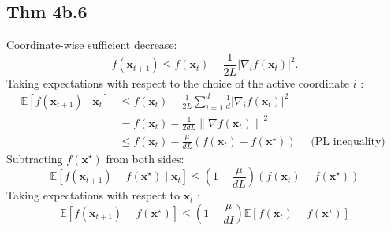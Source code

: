 \subsection*{Thm 4b.6}
Coordinate-wise sufficient decrease:
$$
f\left(\mathbf{x}_{t+1}\right) \leq f\left(\mathbf{x}_{t}\right)-\frac{1}{2 L}\left|\nabla_{i} f\left(\mathbf{x}_{t}\right)\right|^{2} .
$$
Taking expectations with respect to the choice of the active coordinate $i$ :
$$
\begin{aligned}
\mathbb{E}\left[f\left(\mathbf{x}_{t+1}\right) \mid \mathbf{x}_{t}\right] & \leq f\left(\mathbf{x}_{t}\right)-\frac{1}{2 L} \sum_{i=1}^{d} \frac{1}{d}\left|\nabla_{i} f\left(\mathbf{x}_{t}\right)\right|^{2} \\
&=f\left(\mathbf{x}_{t}\right)-\frac{1}{2 d L}\left\|\nabla f\left(\mathbf{x}_{t}\right)\right\|^{2} \\
& \leq f\left(\mathbf{x}_{t}\right)-\frac{\mu}{d L}\left(f\left(\mathbf{x}_{t}\right)-f\left(\mathbf{x}^{\star}\right)\right) \quad \text { (PL inequality) }
\end{aligned}
$$
Subtracting $f\left(\mathbf{x}^{\star}\right)$ from both sides:
$$
\mathbb{E}\left[f\left(\mathbf{x}_{t+1}\right)-f\left(\mathbf{x}^{\star}\right) \mid \mathbf{x}_{t}\right] \leq\left(1-\frac{\mu}{d L}\right)\left(f\left(\mathbf{x}_{t}\right)-f\left(\mathbf{x}^{\star}\right)\right)
$$
Taking expectations with respect to $\mathbf{x}_{t}$ :
$$
\mathbb{E}\left[f\left(\mathbf{x}_{t+1}\right)-f\left(\mathbf{x}^{\star}\right)\right] \leq\left(1-\frac{\mu}{d I}\right) \mathbb{E}\left[f\left(\mathbf{x}_{t}\right)-f\left(\mathbf{x}^{\star}\right)\right]
$$






